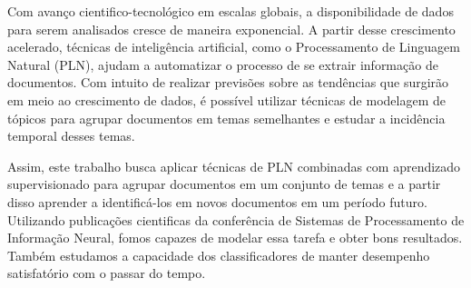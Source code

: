 Com avanço cientifico-tecnológico em escalas globais, a disponibilidade de dados para serem analisados cresce de maneira exponencial. A partir desse crescimento acelerado, técnicas de inteligência artificial, como o Processamento de Linguagem Natural (PLN), ajudam a automatizar o processo de se extrair informação de documentos.  Com intuito de realizar previsões sobre as tendências que surgirão em meio ao crescimento de dados, é possível utilizar técnicas de modelagem de tópicos para agrupar documentos em temas semelhantes e estudar a incidência temporal desses temas.

Assim, este trabalho busca aplicar técnicas de PLN combinadas com aprendizado supervisionado para agrupar documentos em um conjunto de temas e a partir disso aprender a identificá-los em novos documentos em um período futuro. Utilizando publicações cientificas da conferência de Sistemas de Processamento de Informação Neural, fomos capazes de modelar essa tarefa e obter bons resultados. Também estudamos a capacidade dos classificadores de manter desempenho satisfatório com o passar do tempo.
